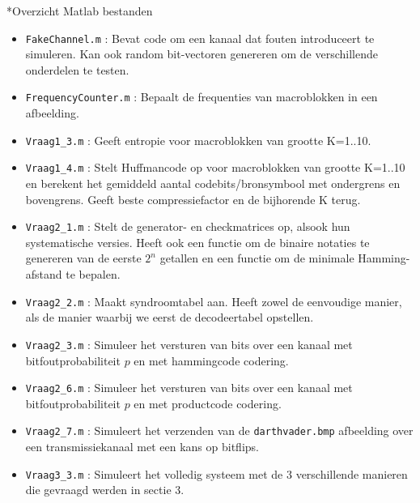 \documentclass[]{article}
\begin{document}
\begin{section}*{Overzicht Matlab bestanden}
\begin{itemize}
    \item \texttt{FakeChannel.m} : Bevat code om een kanaal dat fouten
        introduceert te simuleren. Kan ook random bit-vectoren genereren
        om de verschillende onderdelen te testen.
    \item \texttt{FrequencyCounter.m} : Bepaalt de frequenties van
        macroblokken in een afbeelding.
    \item \texttt{Vraag1\_3.m} : Geeft entropie voor macroblokken van grootte K=1..10.
    \item \texttt{Vraag1\_4.m} : Stelt Huffmancode op voor macroblokken
        van grootte K=1..10 en berekent het gemiddeld aantal
        codebits/bronsymbool met ondergrens en bovengrens. Geeft beste
        compressiefactor en de bijhorende K terug.
    \item \texttt{Vraag2\_1.m} : Stelt de generator- en checkmatrices op, 
    	alsook hun systematische versies. 
    	Heeft ook een functie om de binaire notaties te genereren van 
    	de eerste $2^n$ getallen en een functie om de minimale 
    	Hamming-afstand te bepalen.
    \item \texttt{Vraag2\_2.m} : Maakt syndroomtabel aan. Heeft zowel
        de eenvoudige manier, als de manier waarbij we eerst de
        decodeertabel opstellen.
    \item \texttt{Vraag2\_3.m} :  Simuleer het versturen van bits over
        een kanaal met bitfoutprobabiliteit $p$ en met hammingcode
        codering.
    \item \texttt{Vraag2\_6.m} : Simuleer het versturen van bits over
        een kanaal met bitfoutprobabiliteit $p$ en met productcode
        codering.
    \item \texttt{Vraag2\_7.m} : Simuleert het verzenden van de
        \texttt{darthvader.bmp} afbeelding over een transmissiekanaal
        met een kans op bitflips.
     \item \texttt{Vraag3\_3.m} : Simuleert het volledig systeem met de 3
        verschillende manieren die gevraagd werden in sectie 3.
\end{itemize}
\end{section}
\end{document}
